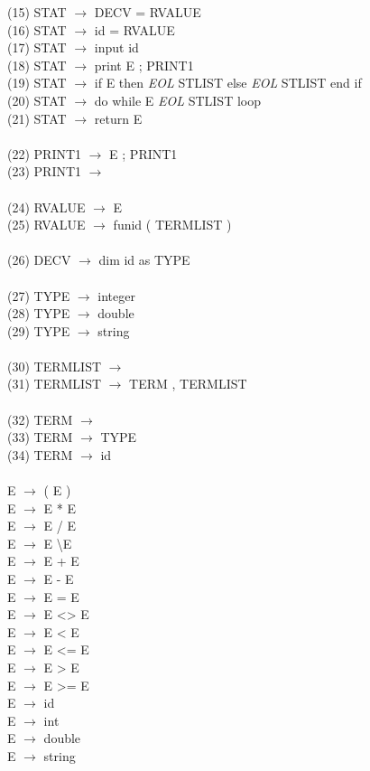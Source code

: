 \documentclass[14pt, a4paper]{extarticle}
\begin{document}
(15) STAT $\rightarrow$ DECV = RVALUE \\
(16) STAT $\rightarrow$ id = RVALUE \\
(17) STAT $\rightarrow$ input  id \\
(18) STAT $\rightarrow$ print  E ; PRINT1 \\
(19) STAT $\rightarrow$ if  E  then \textit{EOL} STLIST  else \textit{EOL} STLIST  end  if \\
(20) STAT $\rightarrow$ do  while  E \textit{EOL} STLIST  loop \\
(21) STAT $\rightarrow$ return  E \\
\\
(22) PRINT1 $\rightarrow$ E ; PRINT1 \\
(23) PRINT1 $\rightarrow$ \textepsilon \\
\\
(24) RVALUE $\rightarrow$ E \\
(25) RVALUE $\rightarrow$ funid ( TERMLIST ) \\
\\
(26) DECV $\rightarrow$ dim  id  as  TYPE \\
\\
(27) TYPE $\rightarrow$ integer \\
(28) TYPE $\rightarrow$ double \\
(29) TYPE $\rightarrow$ string \\
\\
(30) TERMLIST $\rightarrow$ \textepsilon \\
(31) TERMLIST $\rightarrow$ TERM , TERMLIST \\
\\
(32) TERM $\rightarrow$ \textepsilon \\
(33) TERM $\rightarrow$ TYPE \\
(34) TERM $\rightarrow$ id \\
\\
E $\rightarrow$ ( E ) \\
E $\rightarrow$ E * E \\
E $\rightarrow$ E / E \\
E $\rightarrow$ E \textbackslash E \\
E $\rightarrow$ E + E \\
E $\rightarrow$ E - E \\
E $\rightarrow$ E = E \\
E $\rightarrow$ E <> E \\
E $\rightarrow$ E < E \\
E $\rightarrow$ E <= E \\
E $\rightarrow$ E > E \\
E $\rightarrow$ E >= E \\
E $\rightarrow$ id \\
E $\rightarrow$ int \\
E $\rightarrow$ double \\
E $\rightarrow$ string 
\end{document}
